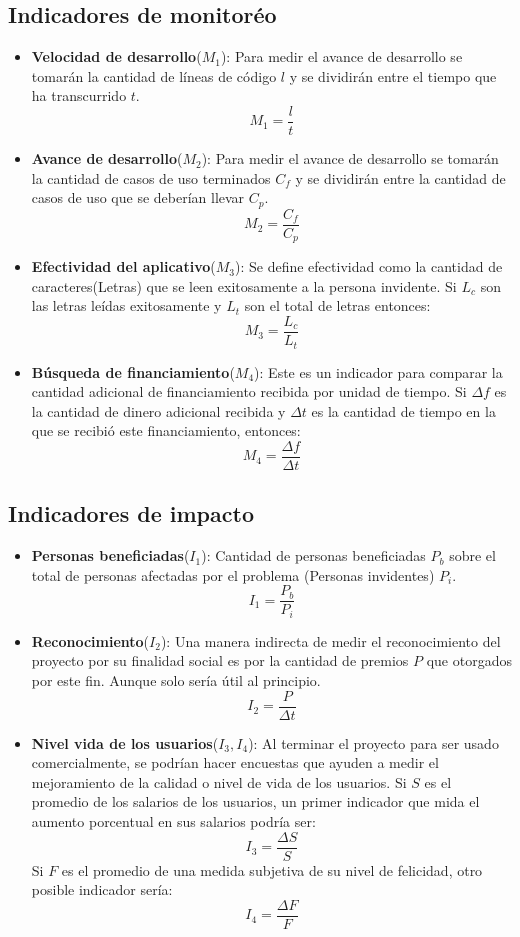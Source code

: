 \documentclass[a4paper, 12pt, oneside]{article}
\begin{document}
	\subsection{Indicadores de monitoréo}
	\begin{itemize}
		\item {\bf Velocidad de desarrollo}($M_1$): Para medir el avance de desarrollo se tomarán la cantidad
			de líneas de código $l$ y se dividirán entre el tiempo que ha transcurrido $t$.
			\[M_1 = \frac{l}{t}\]
		\item {\bf Avance de desarrollo}($M_2$): Para medir el avance de desarrollo se tomarán la cantidad
			de casos de uso terminados $C_f$ y se dividirán entre la cantidad de casos de uso que se deberían
			llevar $C_p$.
			\[M_2 = \frac{C_f}{C_p}\]
		\item {\bf Efectividad del aplicativo}($M_3$): Se define efectividad como la cantidad de caracteres(Letras)
			que se leen exitosamente a la persona invidente. Si $L_c$ son las letras leídas exitosamente y $L_t$
			son el total de letras entonces:
			\[M_3 = \frac{L_c}{L_t}\]	
		\item {\bf Búsqueda de financiamiento}($M_4$): Este es un indicador para comparar la cantidad adicional de
			financiamiento recibida por unidad de tiempo. Si $\Delta f$ es la cantidad de dinero adicional recibida
			y $\Delta t$ es la cantidad de tiempo en la que se recibió este financiamiento, entonces:
			\[M_4 = \frac{\Delta f}{\Delta t}\]
	\end{itemize}
	
	\subsection{Indicadores de impacto}

	\begin{itemize}
		\item {\bf Personas beneficiadas}($I_1$): Cantidad de personas beneficiadas $P_b$ sobre el total
			de personas afectadas por el problema (Personas invidentes) $P_i$.
			\[I_1 = \frac{P_b}{P_i}\]
		\item {\bf Reconocimiento}($I_2$): Una manera indirecta de medir el reconocimiento del proyecto por su
		 finalidad social es por la cantidad de premios $P$ que otorgados por este fin. Aunque solo sería útil
		 al principio.
			\[I_2 = \frac{P}{\Delta t}\]
		\item {\bf Nivel vida de los usuarios}($I_3,I_4$): Al terminar el proyecto para ser usado comercialmente,
			se podrían hacer encuestas que ayuden a medir el mejoramiento de la calidad o nivel de vida de los usuarios.
			Si $S$ es el promedio de los salarios de los usuarios, un primer indicador que mida el aumento porcentual
			en sus salarios podría ser:
			\[I_3 = \frac{\Delta S}{S}\]
			Si $F$ es el promedio de una medida subjetiva de su nivel de felicidad, otro posible indicador sería:
			\[I_4 = \frac{\Delta F}{F}\]
	\end{itemize}
	
\end{document}
